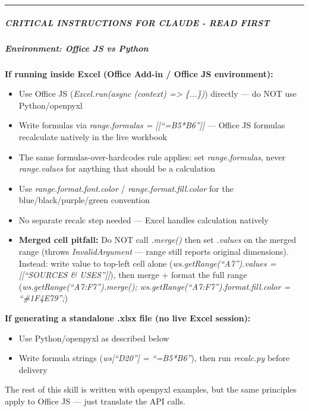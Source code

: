 \documentclass[11pt]{article}
\begin{document}
\vspace{0.5em}\hrule\vspace{0.5em}

\subparagraph{CRITICAL INSTRUCTIONS FOR CLAUDE - READ FIRST}\mbox{}\par

\subparagraph{Environment: Office JS vs Python}\mbox{}\par

\textbf{If running inside Excel (Office Add-in / Office JS environment):}

\begin{itemize}[leftmargin=*,itemsep=2pt,topsep=2pt]
\item {} Use Office JS (\emph{Excel.run(async (context) => \{...\})}) directly — do NOT use Python/openpyxl
\item {} Write formulas via \emph{range.formulas = [[``=B5*B6'']]} — Office JS formulas recalculate natively in the live workbook
\item {} The same formulas-over-hardcodes rule applies: set \emph{range.formulas}, never \emph{range.values} for anything that should be a calculation
\item {} Use \emph{range.format.font.color} / \emph{range.format.fill.color} for the blue/black/purple/green convention
\item {} No separate recalc step needed — Excel handles calculation natively
\item {} \textbf{Merged cell pitfall:} Do NOT call \emph{.merge()} then set \emph{.values} on the merged range (throws \emph{InvalidArgument} — range still reports original dimensions). Instead: write value to top-left cell alone (\emph{ws.getRange(``A7'').values = [[``SOURCES \& USES'']]}), then merge + format the full range (\emph{ws.getRange(``A7:F7'').merge(); ws.getRange(``A7:F7'').format.fill.color = ``\#1F4E79'';})
\end{itemize}

\textbf{If generating a standalone .xlsx file (no live Excel session):}

\begin{itemize}[leftmargin=*,itemsep=2pt,topsep=2pt]
\item {} Use Python/openpyxl as described below
\item {} Write formula strings (\emph{ws[``D20''] = ``=B5*B6''}), then run \emph{recalc.py} before delivery
\end{itemize}

The rest of this skill is written with openpyxl examples, but the same principles apply to Office JS — just translate the API calls.
\end{document}
